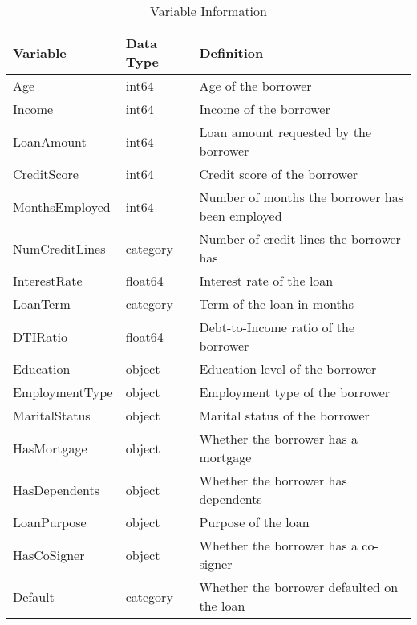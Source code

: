\begin{table}[H]
\caption{Variable Information}
\label{Table 1:variable_info}
\begin{tabular}{lll}
\toprule
Variable & Data Type & Definition \\
\midrule
Age & int64 & Age of the borrower \\
Income & int64 & Income of the borrower \\
LoanAmount & int64 & Loan amount requested by the borrower \\
CreditScore & int64 & Credit score of the borrower \\
MonthsEmployed & int64 & Number of months the borrower has been employed \\
NumCreditLines & category & Number of credit lines the borrower has \\
InterestRate & float64 & Interest rate of the loan \\
LoanTerm & category & Term of the loan in months \\
DTIRatio & float64 & Debt-to-Income ratio of the borrower \\
Education & object & Education level of the borrower \\
EmploymentType & object & Employment type of the borrower \\
MaritalStatus & object & Marital status of the borrower \\
HasMortgage & object & Whether the borrower has a mortgage \\
HasDependents & object & Whether the borrower has dependents \\
LoanPurpose & object & Purpose of the loan \\
HasCoSigner & object & Whether the borrower has a co-signer \\
Default & category & Whether the borrower defaulted on the loan \\
\bottomrule
\end{tabular}
\end{table}
